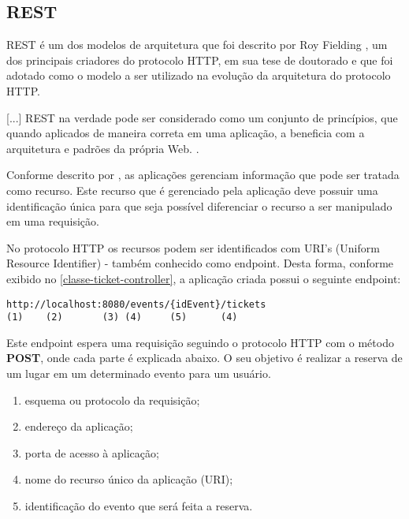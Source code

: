 \subsection{REST}\label{rest}

\begin{citacao}

REST é um dos modelos de arquitetura que foi descrito por
Roy Fielding \cite[5]{rest-roy-thomas-fielding},
um dos principais criadores do protocolo HTTP, em sua tese de doutorado
e que foi adotado como o modelo a ser utilizado na evolução da arquitetura
do protocolo HTTP.

[...] REST na verdade pode ser considerado como um conjunto de princípios,
que quando aplicados de maneira correta em uma aplicação, a beneficia com a
arquitetura e padrões da própria Web. \cite{rest-principios-e-boas-praticas}.

\end{citacao}

Conforme descrito por \cite{rest-principios-e-boas-praticas}, as aplicações
gerenciam informação que pode ser tratada como recurso. Este recurso que é
gerenciado pela aplicação deve possuir uma identificação única para que seja
possível diferenciar o recurso a ser manipulado em uma requisição.

No protocolo HTTP os recursos podem ser identificados com
URI's (Uniform Resource Identifier) - também conhecido como endpoint.
Desta forma, conforme exibido no \autoref{classe-ticket-controller},
a aplicação criada possui o seguinte endpoint:

\begin{minipage}{\linewidth}
\begin{lstlisting}[basicstyle=\ttfamily]
http://localhost:8080/events/{idEvent}/tickets
(1)    (2)       (3) (4)     (5)      (4)
\end{lstlisting}
\end{minipage}

Este endpoint espera uma requisição seguindo o protocolo HTTP
com o método \textbf{POST}, onde cada parte é explicada abaixo. O seu objetivo é
realizar a reserva de um lugar em um determinado evento para um usuário.

\begin{enumerate}

  \item esquema ou protocolo da requisição;

  \item endereço da aplicação;

  \item porta de acesso à aplicação;

  \item nome do recurso único da aplicação (URI);

  \item identificação do evento que será feita a reserva.

\end{enumerate}
